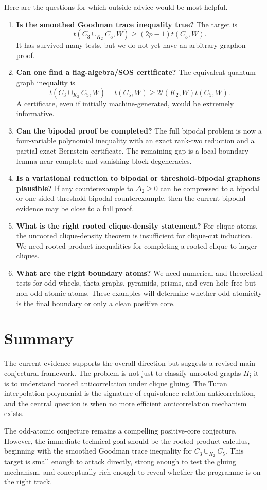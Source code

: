 \documentclass[11pt]{article}
\theoremstyle{definition}
\begin{document}
Here are the questions for which outside advice would be most helpful.

\begin{enumerate}[label=\textbf{Q\arabic*.},leftmargin=*]
\item \textbf{Is the smoothed Goodman trace inequality true?}  The target is
\[
  t(C_3\cup_{K_2}C_5,W)\ge(2p-1)t(C_5,W).
\]
It has survived many tests, but we do not yet have an arbitrary-graphon proof.

\item \textbf{Can one find a flag-algebra/SOS certificate?}  The equivalent quantum-graph inequality is
\[
  t(C_3\cup_{K_2}C_5,W)+t(C_5,W)
  \ge 2t(K_2,W)t(C_5,W).
\]
A certificate, even if initially machine-generated, would be extremely informative.

\item \textbf{Can the bipodal proof be completed?}  The full bipodal problem is now a four-variable polynomial inequality with an exact rank-two reduction and a partial exact Bernstein certificate.  The remaining gap is a local boundary lemma near complete and vanishing-block degeneracies.

\item \textbf{Is a variational reduction to bipodal or threshold-bipodal graphons plausible?}  If any counterexample to $\Delta_2\ge0$ can be compressed to a bipodal or one-sided threshold-bipodal counterexample, then the current bipodal evidence may be close to a full proof.

\item \textbf{What is the right rooted clique-density statement?}  For clique atoms, the unrooted clique-density theorem is insufficient for clique-cut induction.  We need rooted product inequalities for completing a rooted clique to larger cliques.

\item \textbf{What are the right boundary atoms?}  We need numerical and theoretical tests for odd wheels, theta graphs, pyramids, prisms, and even-hole-free but non-odd-atomic atoms.  These examples will determine whether odd-atomicity is the final boundary or only a clean positive core.
\end{enumerate}


\section{Summary}

The current evidence supports the overall direction but suggests a revised main conjectural framework.  The problem is not just to classify unrooted graphs $H$; it is to understand rooted anticorrelation under clique gluing.  The Turan interpolation polynomial is the signature of equivalence-relation anticorrelation, and the central question is when no more efficient anticorrelation mechanism exists.

The odd-atomic conjecture remains a compelling positive-core conjecture.  However, the immediate technical goal should be the rooted product calculus, beginning with the smoothed Goodman trace inequality for $C_3\cup_{K_2}C_5$.  This target is small enough to attack directly, strong enough to test the gluing mechanism, and conceptually rich enough to reveal whether the programme is on the right track.
\end{document}
